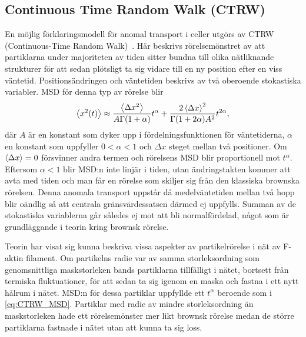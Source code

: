 \subsection{Continuous Time Random Walk (CTRW)}
En möjlig förklaringsmodell för anomal transport i celler utgörs av CTRW (Continuous-Time Random Walk)~\cite{Hofling&Franosch2013}. Här beskrivs rörelsemönstret av att partiklarna under majoriteten av tiden sitter bundna till olika nätliknande strukturer för att sedan plötsligt ta sig vidare till en ny position efter en viss väntetid. Positionsändringen och väntetiden beskrivs av två oberoende stokastiska variabler. 
MSD för denna typ av rörelse blir\cite{Barilan_CTRW}
\begin{equation}\label{eq:CTRW_MSD}
    \ev{x^2(t)} \approx \frac{\ev{\Delta x^2}}{A \Gamma(1+\alpha)}t^{\alpha} + \frac{2\ev{\Delta x}^2}{\Gamma(1+2\alpha)A^2} t^{2\alpha}, 
\end{equation}
där $A$ är en konstant som dyker upp i fördelningsfunktionen för väntetiderna, $\alpha$ en konstant som uppfyller $0<\alpha<1$ och $\Delta x$ steget mellan två positioner. Om $\ev{\Delta x}=0 $ försvinner andra termen och rörelsens MSD blir proportionell mot $t^\alpha$. Eftersom $\alpha < 1$ blir MSD:n inte linjär i tiden, utan ändringstakten kommer att avta med tiden och man får en rörelse som skiljer sig från den klassiska brownska rörelsen.
Denna anomala transport uppstår då medelväntetiden mellan två hopp blir oändlig så att centrala gränsvärdessatsen därmed ej uppfylls. Summan av de stokastiska variablerna går således ej mot att bli normalfördelad, något som är grundläggande i teorin kring brownsk rörelse. 

Teorin har visat sig kunna beskriva vissa aspekter av partikelrörelse i nät av F-aktin filament\cite{Barilan_CTRW}. Om partikelns radie var av samma storleksordning som genomsnittliga maskstorleken bands partiklarna tillfälligt i nätet, bortsett från termiska fluktuationer, för att sedan ta sig igenom en maska och fastna i ett nytt hålrum i nätet. MSD:n för dessa partiklar uppfyllde ett $t^{\alpha}$ beroende som i \eqref{eq:CTRW_MSD}. Partiklar med radie av mindre storleksordning än maskstorleken hade ett rörelsemönster mer likt brownsk rörelse medan de större partiklarna fastnade i nätet utan att kunna ta sig loss.



